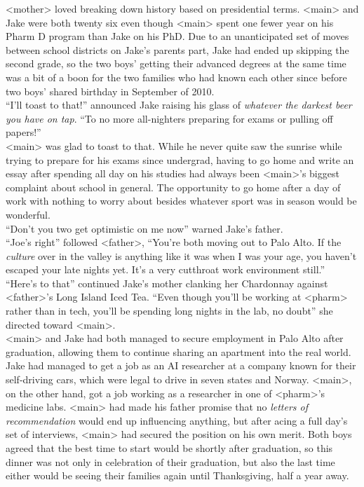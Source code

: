 \documentclass[12pt,openany]{memoir}
\begin{document}
<mother> loved breaking down history based on presidential terms.
<main> and Jake were both twenty six even though <main> spent one fewer year on his Pharm D program than Jake on his PhD.
Due to an unanticipated set of moves between school districts on Jake's parents part, Jake had ended up skipping the second grade, so the two boys' getting their advanced degrees at the same time was a bit of a boon for the two families who had known each other since before two boys' shared birthday in September of 2010.
\\

``I'll toast to that!'' announced Jake raising his glass of \textit{whatever the darkest beer you have on tap}.
``To no more all-nighters preparing for exams or pulling off papers!''
\\

<main> was glad to toast to that.
While he never quite saw the sunrise while trying to prepare for his exams since undergrad, having to go home and write an essay after spending all day on his studies had always been <main>'s biggest complaint about school in general.
The opportunity to go home after a day of work with nothing to worry about besides whatever sport was in season would be wonderful.
\\

``Don't you two get optimistic on me now'' warned Jake's father.
\\

``Joe's right'' followed <father>, ``You're both moving out to Palo Alto.
If the \textit{culture} over in the valley is anything like it was when I was your age, you haven't escaped your late nights yet.
It's a very cutthroat work environment still.''
\\

``Here's to that'' continued Jake's mother clanking her Chardonnay against <father>'s Long Island Iced Tea.
``Even though you'll be working at <pharm> rather than in tech, you'll be spending long nights in the lab, no doubt'' she directed toward <main>.
\\

<main> and Jake had both managed to secure employment in Palo Alto after graduation, allowing them to continue sharing an apartment into the real world.
Jake had managed to get a job as an AI researcher at a company known for their self-driving cars, which were legal to drive in seven states and Norway.
<main>, on the other hand, got a job working as a researcher in one of <pharm>'s medicine labs.
<main> had made his father promise that no \textit{letters of recommendation} would end up influencing anything, but after acing a full day's set of interviews, <main> had secured the position on his own merit. Both boys agreed that the best time to start would be shortly after graduation, so this dinner was not only in celebration of their graduation, but also the last time either would be seeing their families again until Thanksgiving, half a year away.
\\
\end{document}
